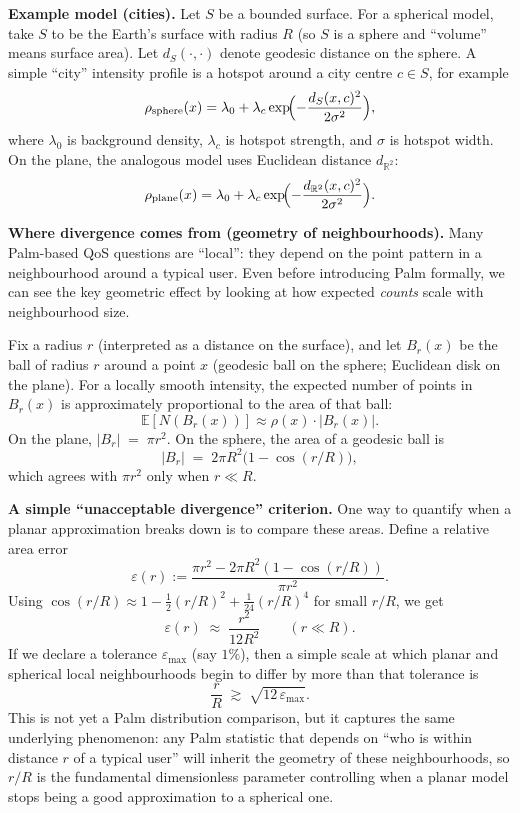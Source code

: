\noindent\textbf{Example model (cities).}
Let $S$ be a bounded surface.
For a spherical model, take $S$ to be the Earth's surface with radius $R$ (so $S$ is a sphere and ``volume'' means surface
area). Let $d_S(\cdot,\cdot)$ denote geodesic distance on the sphere. A simple ``city'' intensity profile is a hotspot
around a city centre $c\in S$, for example
$$
\rho_{\text{sphere}}(x)=\lambda_0+\lambda_c\exp\!\Bigl(-\frac{d_S(x,c)^2}{2\sigma^2}\Bigr),
$$
where $\lambda_0$ is background density, $\lambda_c$ is hotspot strength, and $\sigma$ is hotspot width.
On the plane, the analogous model uses Euclidean distance $d_{\mathbb{R}^2}$:
$$
\rho_{\text{plane}}(x)=\lambda_0+\lambda_c\exp\!\Bigl(-\frac{d_{\mathbb{R}^2}(x,c)^2}{2\sigma^2}\Bigr).
$$

\noindent\textbf{Where divergence comes from (geometry of neighbourhoods).}
Many Palm-based QoS questions are ``local'': they depend on the point pattern in a neighbourhood around a typical user.
Even before introducing Palm formally, we can see the key geometric effect by looking at how expected \emph{counts} scale
with neighbourhood size.

Fix a radius $r$ (interpreted as a distance on the surface), and let $B_r(x)$ be the ball of radius $r$ around a point
$x$ (geodesic ball on the sphere; Euclidean disk on the plane).
For a locally smooth intensity, the expected number of points in $B_r(x)$ is approximately proportional to the area of
that ball:
$$
\mathbb{E}[N(B_r(x))]\approx \rho(x)\cdot |B_r(x)|.
$$
On the plane, $|B_r|\;=\;\pi r^2$. On the sphere, the area of a geodesic ball is
$$
|B_r| \;=\; 2\pi R^2\bigl(1-\cos(r/R)\bigr),
$$
which agrees with $\pi r^2$ only when $r\ll R$.

\noindent\textbf{A simple ``unacceptable divergence'' criterion.}
One way to quantify when a planar approximation breaks down is to compare these areas.
Define a relative area error
$$
\varepsilon(r) := \frac{\pi r^2 - 2\pi R^2(1-\cos(r/R))}{\pi r^2}.
$$
Using $\cos(r/R)\approx 1-\tfrac{1}{2}(r/R)^2+\tfrac{1}{24}(r/R)^4$ for small $r/R$, we get
$$
\varepsilon(r) \;\approx\; \frac{r^2}{12R^2}\qquad (r\ll R).
$$
If we declare a tolerance $\varepsilon_{\max}$ (say $1\%$), then a simple scale at which planar and spherical local
neighbourhoods begin to differ by more than that tolerance is
$$
\frac{r}{R} \;\gtrsim\; \sqrt{12\,\varepsilon_{\max}}.
$$
This is not yet a Palm distribution comparison, but it captures the same underlying phenomenon: any Palm statistic that
depends on ``who is within distance $r$ of a typical user'' will inherit the geometry of these neighbourhoods, so $r/R$ is
the fundamental dimensionless parameter controlling when a planar model stops being a good approximation to a spherical
one.
